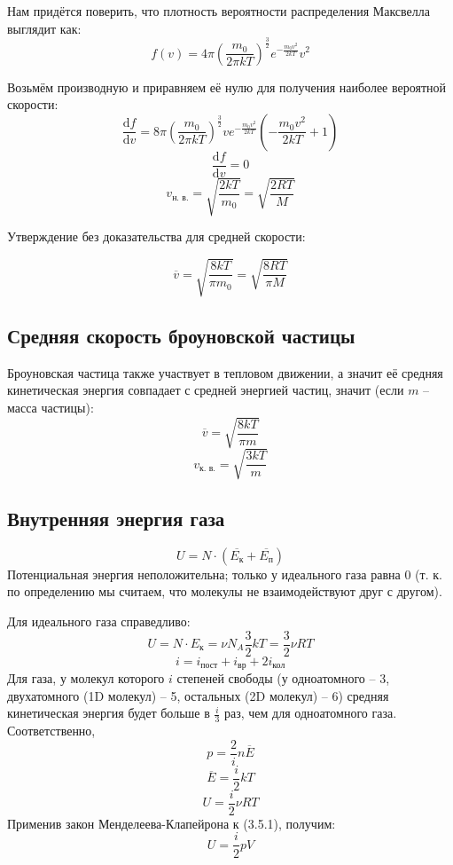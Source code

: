 
Нам придётся поверить, что плотность вероятности распределения Максвелла выглядит как:
\[f(v) = 4\pi(\frac{m_0}{2\pi k T})^{\frac{3}{2}}e^{-\frac{m_0v^2}{2 k T}}v^2\]

Возьмём производную и приравняем её нулю для получения наиболее вероятной скорости:
\[\frac{\text{d}f}{\text{d}v}=8\pi(\frac{m_0}{2\pi k T})^{\frac{3}{2}}ve^{-\frac{m_0v^2}{2 k T}}(-\frac{m_0 v^2}{2kT}+1)\]
\[\frac{\text{d}f}{\text{d}v}=0\]
\[v_{\text{н. в.}}=\sqrt{\frac{2kT}{m_0}}=\sqrt{\frac{2RT}{M}}\]

Утверждение без доказательства для средней скорости:\par
\[\overline{v}=\sqrt{\frac{8kT}{\pi m_0}}=\sqrt{\frac{8RT}{\pi M}}\]



\subsection{Средняя скорость броуновской частицы}
Броуновская частица также участвует в тепловом движении, а значит её средняя кинетическая энергия совпадает с средней энергией частиц, значит (если $m$ -- масса частицы):
\[\overline{v}=\sqrt{\frac{8kT}{\pi m}}\]
\[v_{\text{к. в.}}=\sqrt{\frac{3kT}{m}}\]



\subsection{Внутренняя энергия газа}
\[U=N \cdot (\overline{E_\text{к}}+\overline{E_\text{п}})\]
Потенциальная энергия неположительна; только у идеального газа равна 0 (т. к. по определению мы считаем, что молекулы не взаимодействуют друг с другом).\par

Для идеального газа справедливо:
\[U=N\cdot E_{\text{к}}=\nu N_A \frac{3}{2}kT=\frac{3}{2} \nu RT\]
\[i = i_\text{пост} + i_\text{вр} + 2 i_\text{кол} \]
Для газа, у молекул которого $i$ степеней свободы (у одноатомного -- 3, двухатомного (1D молекул) -- 5, остальных (2D молекул) -- 6) средняя кинетическая энергия будет больше в $\frac{i}{3}$ раз, чем для одноатомного газа. Соответственно,
\[ p = \frac{2}{i} n \overline{E} \]
\[ \overline{E}=\frac{i}{2}kT \]
\begin{equation}
U=\frac{i}{2}\nu RT
\end{equation}
Применив закон Менделеева-Клапейрона к (3.5.1), получим:
\begin{equation*}
U=\frac{i}{2}pV
\end{equation*}